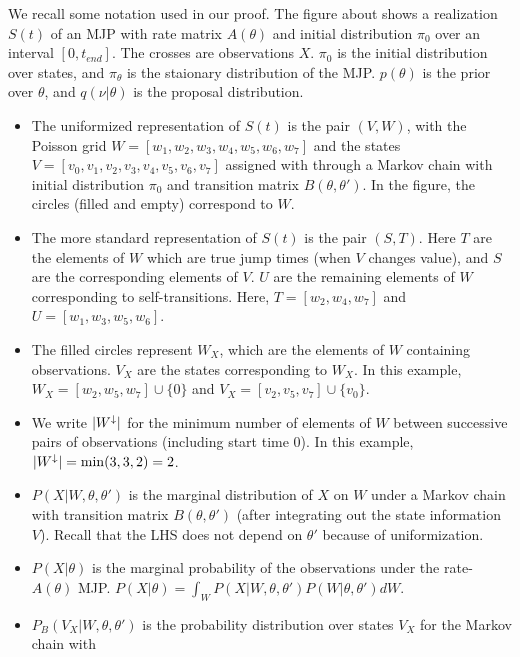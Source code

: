 {We recall some notation used in our proof. 
  The figure about shows a realization $S(t)$ of an MJP with rate matrix 
  $A(\theta)$ and initial distribution $\pi_0$ over an interval 
  $[0,t_{end}]$. The crosses are observations $X$. $\pi_0$ is the initial 
  distribution over states, and $\pi_\theta$ is the staionary distribution 
  of the MJP.
    $p(\theta)$ is the prior over $\theta$, and $q(\nu|\theta)$ is 
      the proposal distribution.
  \begin{itemize}
    \item The uniformized representation of $S(t)$ is the pair 
      $(V, W)$, with the Poisson grid 
      $W = [w_1, w_2, w_3, w_4, w_5, w_6, w_7]$ and the states 
      $V =[v_0, v_1, v_2, v_3, v_4, v_5, v_6, v_7]$ assigned with through 
      a Markov chain with initial distribution $\pi_0$ and transition 
      matrix $B(\theta,\theta')$. In the figure, the circles (filled and 
      empty) correspond to $W$.
    \item The more standard representation of $S(t)$ is the pair $(S,T)$.
      Here $T$ are the elements of $W$ which are true jump times (when 
      $V$ changes value), and $S$ are the corresponding elements of $V$.
      $U$ are the remaining elements of $W$ corresponding to self-transitions.
      Here, $T = [w_2, w_4, w_7]$ and $U = [w_1, w_3,  w_5, w_6]$. 
    \item The filled circles represent $W_X$, which are the elements of 
      $W$ containing observations. $V_X$ are the states corresponding to 
      $W_X$. In this example, $W_X = [w_2, w_5,w_7] \cup {\{0\}}$ and 
      $V_X = [v_2, v_5, v_7] \cup {\{v_0\}}$. 
    \item We write ${|W^\downarrow}|$ for the minimum number of elements of $W$ between 
      successive pairs of observations (including start time $0$). 
      In this example, ${|W^\downarrow}| = \min (3,3,2)= 2$. 
    \item $P(X | W, \theta, \theta')$ is the marginal distribution of 
      $X$ on $W$ under a Markov chain with 
      transition matrix $B(\theta, \theta')$ (after integrating out the 
      state information $V$). Recall that the LHS does not depend 
      on $\theta'$ because of uniformization.
    \item $P(X|\theta)$ is the marginal probability of the 
      observations under the rate-$A(\theta)$ MJP. 
$P(X | \theta) =  \int_W P(X | W, \theta, \theta') P(W|\theta, \theta')dW$.
    \item $P_B(V_X | W, \theta, \theta')$ is the probability 
      distribution over states $V_X$ for the Markov chain with 

\end{itemize}}
